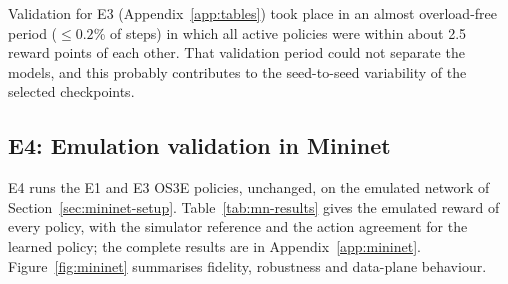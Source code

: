 Validation for E3 (Appendix~\ref{app:tables}) took place in an almost overload-free period ($\le0.2$\% of steps) in which all active policies were within about 2.5 reward points of each other. That validation period could not separate the models, and this probably contributes to the seed-to-seed variability of the selected checkpoints.

\subsection{E4: Emulation validation in Mininet}
\label{sec:res-mininet}

E4 runs the E1 and E3 OS3E policies, unchanged, on the emulated network of Section~\ref{sec:mininet-setup}. Table~\ref{tab:mn-results} gives the emulated reward of every policy, with the simulator reference and the action agreement for the learned policy; the complete results are in Appendix~\ref{app:mininet}. Figure~\ref{fig:mininet} summarises fidelity, robustness and data-plane behaviour.

\begin{table}[htbp]
\centering
\caption{E4 emulated results per run (150 steps). ``Learned'' is current RDQN in current mode and GRU-RDQN in predictive mode. Sim is the simulator reference on the same window; Agr.\ is action agreement between emulation and simulator. Energy and evokes are for the learned and threshold policies. Best emulated reward per run in bold.}
\label{tab:mn-results}
\small
{}
\end{table}

